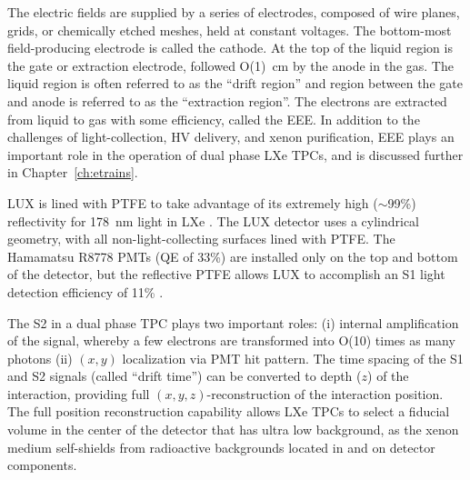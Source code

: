 The electric fields are supplied by a series of electrodes, composed of wire planes, grids, or chemically etched meshes, held at constant voltages. The bottom-most field-producing electrode is called the cathode. At the top of the liquid region is the gate or extraction electrode, followed O(1)~cm by the anode in the gas. The liquid region is often referred to as the ``drift region'' and region between the gate and anode is referred to as the ``extraction region''. The electrons are extracted from liquid to gas with some efficiency, called the \ac{EEE}. In addition to the challenges of light-collection, \ac{HV} delivery, and xenon purification, \ac{EEE} plays an important role in the operation of dual phase \ac{LXe} \ac{TPC}s, and is discussed further in Chapter~\ref{ch:etrains}.

\ac{LUX} is lined with \ac{PTFE} to take advantage of its extremely high ($\sim$99\%) reflectivity for 178~nm light in \ac{LXe} \cite{Neves2017}. The \ac{LUX} detector uses a cylindrical geometry, with all non-light-collecting surfaces lined with \ac{PTFE}. The Hamamatsu R8778 \ac{PMT}s (\ac{QE} of 33\%) are installed only on the top and bottom of the detector, but the reflective \ac{PTFE} allows \ac{LUX} to accomplish an S1 light detection efficiency of 11\% \cite{LUX:Run03Comprehensive}.

The S2 in a dual phase \ac{TPC} plays two important roles: (i) internal amplification of the signal, whereby a few electrons are transformed into O(10) times as many photons (ii) $(x,y)$ localization via \ac{PMT} hit pattern. The time spacing of the S1 and S2 signals (called ``drift time'') can be converted to depth ($z$) of the interaction, providing full $(x,y,z)$-reconstruction of the interaction position. The full position reconstruction capability allows \ac{LXe} \ac{TPC}s to select a fiducial volume in the center of the detector that has ultra low background, as the xenon medium self-shields from radioactive backgrounds located in and on detector components. 

